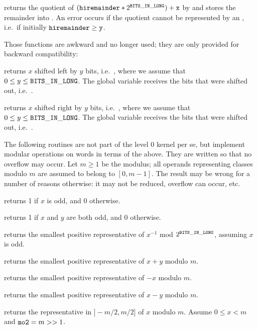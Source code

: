  returns the quotient of
$  \left({\tt hiremainder} * 2^{{\tt BITS\_IN\_LONG}}\right) + {\tt x} $
by  and stores the remainder into . An error occurs
if the quotient cannot be represented by an , i.e.~if initially
${\tt hiremainder}\ge{\tt y}$.

 Those functions are awkward and no longer used;
they are only provided for backward compatibility:

 returns $x$ shifted left by $y$ bits,
i.e.~, where we assume that $0\leq y\leq{\tt BITS\_IN\_LONG}$. The global variable
 receives the bits that were shifted out,
i.e.~.

 returns $x$ shifted right by $y$ bits,
i.e.~, where we assume that $0\leq y\leq{\tt BITS\_IN\_LONG}$. The global variable
 receives the bits that were shifted out,
i.e.~.

The following routines are not part of the level 0 kernel per se, but
implement modular operations on words in terms of the above. They are written
so that no overflow may occur. Let $m \geq 1$ be the modulus; all operands
representing classes modulo $m$ are assumed to belong to $[0,m-1]$. The
result may be wrong for a number of reasons otherwise: it may not be reduced,
overflow can occur, etc.

 returns 1 if $x$ is odd, and 0 otherwise.

 returns 1 if $x$ and $y$ are both odd,
and 0 otherwise.

 returns the smallest
positive representative of $x^{-1}$ mod $2^{\tt BITS\_IN\_LONG}$, assuming $x$ is odd.

 returns the smallest
positive representative of $x + y$ modulo $m$.

 returns the smallest
positive representative of $-x$ modulo $m$.

 returns the smallest
positive representative of $x - y$ modulo $m$.

 returns the representative
in $]-m/2,m/2]$ of $x$ modulo $m$. Assume $0 \leq x < m$ and
${\tt mo2}  = m >> 1$.

